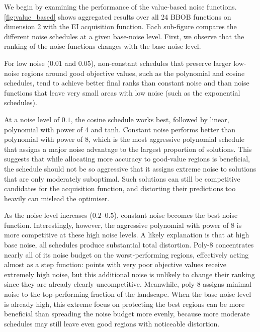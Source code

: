 {We begin by examining the performance of the value-based noise functions.
\autoref{fig:value_based} shows aggregated results over all 24 BBOB functions on dimension 2 with the EI acquisition function. Each sub-figure compares the different noise schedules at a given base-noise level. First, we observe that the ranking of the noise functions changes with the base noise level.

For low noise ($0.01$ and $0.05$), non-constant schedules that preserve larger low-noise regions around good objective values, such as the polynomial and cosine schedules, tend to achieve better final ranks than constant noise and than noise functions that leave very small areas with low noise (such as the exponential schedules).

At a noise level of $0.1$, the cosine schedule works best, followed by linear, polynomial with power of 4 and tanh. Constant noise performs better than polynomial with power of 8, which is the most aggressive polynomial schedule that assigns a major noise advantage to the largest proportion of solutions. This suggests that while allocating more accuracy to good-value regions is beneficial, the schedule should not be so aggressive that it assigns extreme noise to solutions that are only moderately suboptimal. Such solutions can still be competitive candidates for the acquisition function, and distorting their predictions too heavily can mislead the optimiser.

As the noise level increases ($0.2$--$0.5$), constant noise becomes the best noise function. Interestingly, however, the aggressive polynomial with power of 8 is more competitive at these high noise levels. A likely explanation is that at high base noise, all schedules produce substantial total distortion. Poly-8 concentrates nearly all of its noise budget on the worst-performing regions, effectively acting almost as a step function: points with very poor objective values receive extremely high noise, but this additional noise is unlikely to change their ranking since they are already clearly uncompetitive. Meanwhile, poly-8 assigns minimal noise to the top-performing fraction of the landscape. When the base noise level is already high, this extreme focus on protecting the best regions can be more beneficial than spreading the noise budget more evenly, because more moderate schedules may still leave even good regions with noticeable distortion.

}
